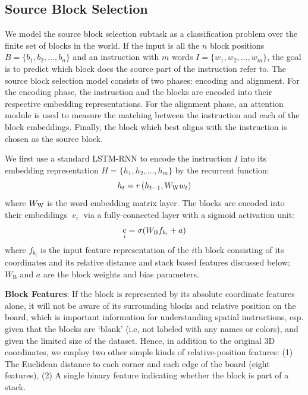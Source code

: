 \documentclass[letterpaper]{article} %
\DeclareMathOperator{\embb}{c}
\begin{document}
\subsection{Source Block Selection} \label{source}
We model the source block selection subtask as a classification problem over the finite set of blocks in the world.
If the input is all the $n$ block positions $B = \{b_1, b_2, \ldots, b_n\}$ and an instruction with $m$ words $I=\{w_1, w_2, \ldots, w_m\}$, the goal is to predict which block does the source part of the instruction refer to.
The source block selection model consists of two phases: encoding and alignment. For the encoding phase, the instruction and the blocks are encoded into their respective embedding representations. For the alignment phase, an attention module is used to measure the matching between the instruction and each of the block embeddings. Finally, the block which best aligns with the instruction is chosen as the source block.

We first use a standard LSTM-RNN to encode the instruction $I$ into its embedding representation $H = \{h_1, h_2, \ldots, h_m\}$ by the recurrent function:
\begin{equation}
h_t = r\left( h_{t-1}, W_{\textsc{W}} w_t \right)
\end{equation}
where $W_{\textsc{W}}$ is the word embedding matrix layer.
The blocks are encoded into their embeddings $\embb_i$ via a fully-connected layer with a sigmoid activation unit:
\begin{equation}
\embb_i = \sigma(W_\textsc{B} f_{b_i} + a)
\end{equation}
where $f_{b_i}$ is the input feature representation of the $i$th block consisting of its coordinates and its relative distance and stack based features discussed below; $W_\text{B}$ and $a$ are the block weights and bias parameters.

\textbf{Block Features}:
If the block is represented by its absolute coordinate features alone, it will not be aware of its surrounding blocks and relative position on the board, which is important information for understanding spatial instructions, esp. given that the blocks are `blank' (i.e, not labeled with any names or colors), and given the limited size of the dataset. Hence, in addition to the original 3D coordinates, we employ two other simple kinds of relative-position features: (1) The Euclidean distance to each corner and each edge of the board (eight features), (2) A single binary feature indicating whether the block is part of a stack.
\end{document}
